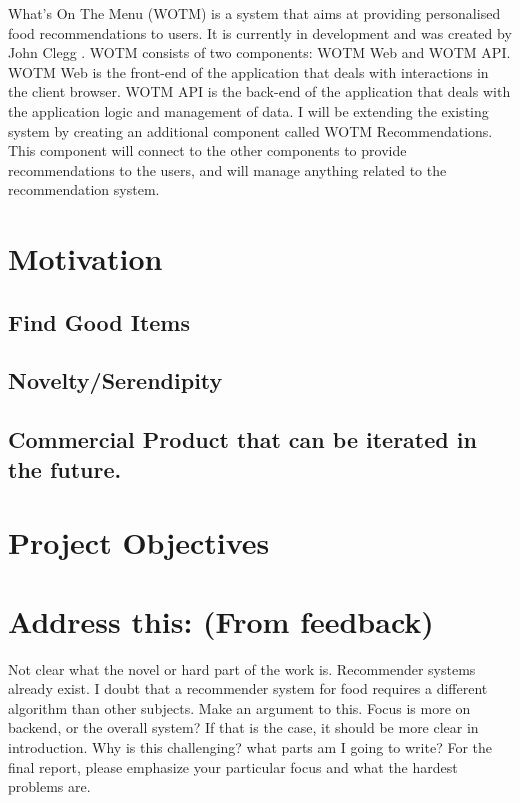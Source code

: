 What's On The Menu (WOTM) is a system that aims at providing personalised food recommendations to users. It is currently in development and was created by John Clegg . WOTM consists of two components: WOTM Web and WOTM API. WOTM Web is the front-end of the application that deals with interactions in the client browser. WOTM API is the back-end of the application that deals with the application logic and management of data. I will be extending the existing system by creating an additional component called WOTM Recommendations. This component will connect to the other components to provide recommendations to the users, and will manage anything related to the recommendation system. 

\section{Motivation}
\subsection{Find Good Items}
\subsection{Novelty/Serendipity}
\subsection{Commercial Product that can be iterated in the future.}
\section{Project Objectives}
\subsection{}
\subsection{}
\subsection{}
\subsection{}


\section{Address this: (From feedback)}
Not clear what the novel or hard part of the work is. Recommender systems already exist. I doubt that a recommender system for food requires a different algorithm than other subjects. Make an argument to this.
Focus is more on backend, or the overall system? If that is the case, it should be more clear in introduction. Why is this challenging? 
what parts am I going to write?
For the final report, please emphasize your particular focus and what the hardest problems are. 
